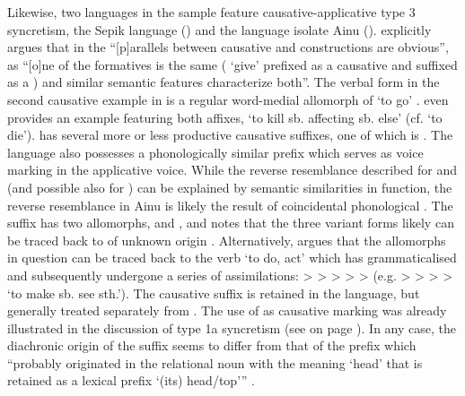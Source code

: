 Likewise, two languages in the sample feature causative-applicative type 3 syncretism, the Sepik language  () and the language isolate Ainu (). \citet[254]{bruce:1979} explicitly argues that in  the “[p]arallels between causative and  constructions are obvious”, as “[o]ne of the formatives is the same ( ‘give’ prefixed as a causative and suffixed as a ) and similar semantic features characterize both”. The verbal form  in the second  causative example in  is a regular word-medial allomorph of  ‘to go’ \citep[250]{bruce:1979}. \citet[358]{bruce:1979} even provides an example featuring both affixes,  ‘to kill sb. affecting sb. else’ (cf.  ‘to die’).  has several more or less productive causative suffixes, one of which is . The language also possesses a phonologically similar prefix  which serves as voice marking in the applicative voice. While the reverse resemblance described for  and  (and possible also for ) can be explained by semantic similarities in function, the reverse resemblance in Ainu is likely the result of coincidental phonological . The suffix  has two allomorphs,  and , and \citet[475]{bugaeva:2015} notes that the three variant forms likely can be traced back to   of unknown origin \citep{vovin:1993}. Alternatively, \citet[15ff.]{nonno:2015} argues that the allomorphs in question can be traced back to the verb  ‘to do, act’ which has grammaticalised and subsequently undergone a series of assimilations:  >  >  >  >  >  (e.g.   >  >  >  >  ‘to make sb. see sth.’). The causative suffix  is retained in the language, but generally treated separately from  \citep{bugaeva:2015}. The use of  as causative marking was already illustrated in the discussion of type 1a syncretism (see  on page \pageref{tab:ch3:type1a-examples-2}). In any case, the diachronic origin of the suffix  seems to differ from that of the prefix  which “probably originated in the relational noun with the meaning ‘head’ that is retained as a lexical prefix  ‘(its) head/top’” \citep[762]{bugaeva:2010}.

